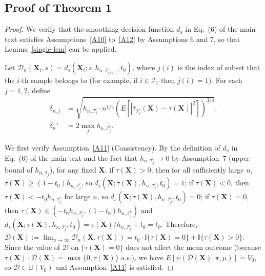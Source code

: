 \documentclass[11pt]{article}
\theoremstyle{referenceplain}
\theoremstyle{referencedefinition}
\theoremstyle{referenceremark}
\begin{document}
\subsection{Proof of Theorem 1}
\begin{proof}
    We verify that the smoothing decision function $d_s$ in 
    Eq.~(6) of the main text satisfies Assumptions~\ref{A10} 
    to~\ref{A12} by Assumptions 6 and 7, so that Lemma~\ref{single-lem} can be applied.

    Let $\mathcal{D}_n(\mathbf{X}_i,s)
    =d_{s}(\mathbf{X}_i;s,h_{n,\mathcal{I}_{j(i)}^c},t_0)$, 
    where $j(i)$ is the index of subset that the $i$-th sample 
    belongs to (for example, if $i\in\mathcal{I}_1$ then 
    $j(i)=1$). {For each $j=1,2$, define}
    \begin{align*}
        {\delta_{n,j}}
        &={\sqrt{h_{n,\mathcal{I}_{j}^c}\cdot n^{1/4}
        \left(E\!\left[|\widehat{\tau}_{\mathcal{I}_{j}^c}
        (\mathbf{X})-\tau(\mathbf{X})|^2\right]\right)^{3/4}}},\\
        \delta_n'&=2\max_j h_{n,\mathcal{I}_{j}^c}.
    \end{align*}

    We first verify Assumption~\ref{A11} (Consistency). 
    By the definition of $d_s$ in Eq.~(6) of the main text 
    and the fact that $h_{n,\mathcal{I}_j^c}\to 0$ by 
    Assumption~7 (upper bound of $h_{n,\mathcal{I}_j}$), 
    for any fixed $\mathbf{X}$: if $\tau(\mathbf{X})>0$, 
    then for all sufficiently large $n$, 
    $\tau(\mathbf{X})\ge (1-t_0)h_{n,\mathcal{I}_j^c}$, 
    so $d_s(\mathbf{X};\tau(\mathbf{X}),
    h_{n,\mathcal{I}_j^c},t_0)=1$; 
    if $\tau(\mathbf{X})<0$, then 
    $\tau(\mathbf{X})<-t_0 h_{n,\mathcal{I}_j^c}$ 
    for large $n$, so 
    $d_s(\mathbf{X};\tau(\mathbf{X}),
    h_{n,\mathcal{I}_j^c},t_0)=0$; 
    if $\tau(\mathbf{X})=0$, then 
    $\tau(\mathbf{X})\in(-t_0 h_{n,\mathcal{I}_j^c},
    (1-t_0)h_{n,\mathcal{I}_j^c})$ and 
    $d_s(\mathbf{X};\tau(\mathbf{X}),
    h_{n,\mathcal{I}_j^c},t_0)
    =\tau(\mathbf{X})/h_{n,\mathcal{I}_j^c}+t_0=t_0$. 
    Therefore, 
    $\mathcal{D}(\mathbf{X})
    :=\lim_{n\to\infty}\mathcal{D}_n(\mathbf{X},\tau(\mathbf{X}))
    =t_0\cdot\mathbb{I}\{\tau(\mathbf{X})=0\}
    +\mathbb{I}\{\tau(\mathbf{X})>0\}$. 
    Since the value of $\mathcal{D}$ on 
    $\{\tau(\mathbf{X})=0\}$ does not affect the mean outcome 
    (because $\tau(\mathbf{X})\cdot\mathcal{D}(\mathbf{X})
    =\max\{0,\tau(\mathbf{X})\}$ a.s.), we have 
    $E[\psi(\mathcal{D}(\mathbf{X}),\pi,\mu)]=V_0$, 
    so $\mathcal{D}\in\mathbb{D}(V_0)$ and 
    Assumption~\ref{A11} is satisfied.


\end{proof}
\end{document}
